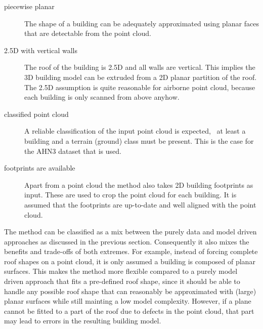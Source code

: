 \begin{description}
	\item[piecewise planar] The shape of a building can be adequately approximated using planar faces that are detectable from the point cloud.
	\item[2.5D with vertical walls] The roof of the building is 2.5D and all walls are vertical. This implies the 3D building model can be extruded from a 2D planar partition of the roof. The 2.5D assumption is quite reasonable for airborne point cloud, because each building is only scanned from above anyhow.
	\item[classified point cloud] A reliable classification of the input point cloud is expected, \ie\ at least a building and a terrain (ground) class must be present. This is the case for the AHN3 dataset that is used.
	\item[footprints are available] Apart from a point cloud the method also takes 2D building footprints as input. These are used to crop the point cloud for each building. It is assumed that the footprints are up-to-date and well aligned with the point cloud.
\end{description}

The method can be classified as a mix between the purely data and model driven approaches as discussed in the previous section. 
Consequently it also mixes the benefits and trade-offs of both extremes.
For example, instead of forcing complete roof shapes on a point cloud, it is only assumed a building is composed of planar surfaces.
This makes the method more flexible compared to a purely model driven approach that fits a pre-defined roof shape, since it should be able to handle any possible roof shape that can reasonably be approximated with (large) planar surfaces while still mainting a low model complexity.
However, if a plane cannot be fitted to a part of the roof due to defects in the point cloud, that part may lead to errors in the resulting building model.


